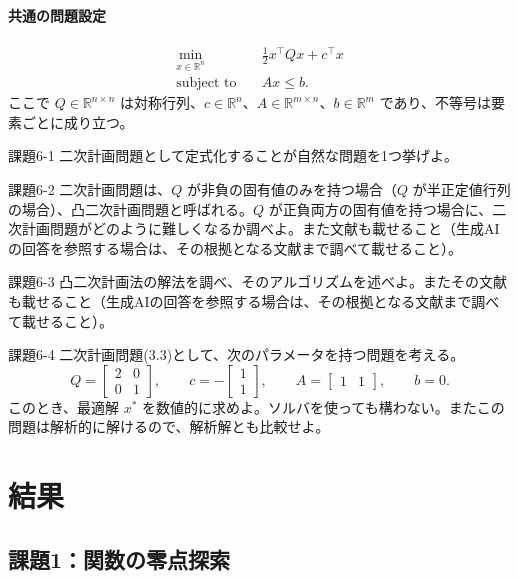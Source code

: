\documentclass[a4j]{jarticle}
\begin{document}
\paragraph{共通の問題設定}
\[
\begin{aligned}
\min_{x\in\mathbb{R}^n}\quad &\frac12 x^\top Qx+c^\top x\\
\operatorname{subject\ to}\quad &Ax\le b.
\end{aligned}\tag{3.3}\label{eq:qp}
\]
ここで $Q\in\mathbb{R}^{n\times n}$ は対称行列、$c\in\mathbb{R}^n$、$A\in\mathbb{R}^{m\times n}$、$b\in\mathbb{R}^m$ であり、不等号は要素ごとに成り立つ。
\begin{itembox}[l]{課題6-1}
二次計画問題として定式化することが自然な問題を1つ挙げよ。
\end{itembox}
\begin{itembox}[l]{課題6-2}
二次計画問題は、$Q$ が非負の固有値のみを持つ場合（$Q$ が半正定値行列の場合）、凸二次計画問題と呼ばれる。$Q$ が正負両方の固有値を持つ場合に、二次計画問題がどのように難しくなるか調べよ。また文献も載せること（生成AIの回答を参照する場合は、その根拠となる文献まで調べて載せること）。
\end{itembox}
\begin{itembox}[l]{課題6-3}
凸二次計画法の解法を調べ、そのアルゴリズムを述べよ。またその文献も載せること（生成AIの回答を参照する場合は、その根拠となる文献まで調べて載せること）。
\end{itembox}
\begin{itembox}[l]{課題6-4}
二次計画問題(3.3)として、次のパラメータを持つ問題を考える。
\[
Q=\begin{bmatrix}2&0\\0&1\end{bmatrix},\qquad
c=-\begin{bmatrix}1\\1\end{bmatrix},\qquad
A=\begin{bmatrix}1&1\end{bmatrix},\qquad b=0.
\]
このとき、最適解 $x^*$ を数値的に求めよ。ソルバを使っても構わない。またこの問題は解析的に解けるので、解析解とも比較せよ。
\end{itembox}

\clearpage
\section{結果}

\subsection{課題1：関数の零点探索}
\end{document}
